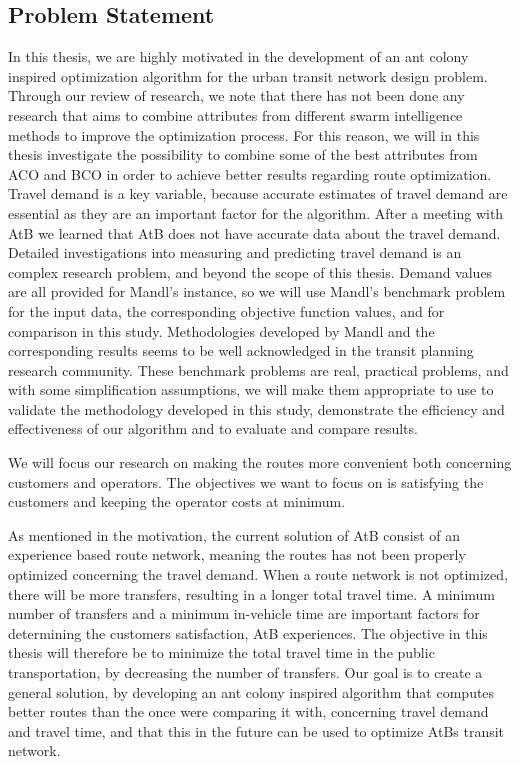 \subsection{Problem Statement}
In this thesis, we are highly motivated in the development of an ant colony inspired optimization algorithm for the urban transit network design problem. Through our review of research, we note that there has not been done any research that aims to combine attributes from different swarm intelligence methods to improve the optimization process. For this reason, we will in this thesis investigate the possibility to combine some of the best attributes from ACO and BCO in order to achieve better results regarding route optimization. Travel demand is a key variable, because accurate estimates of travel demand are essential as they are an important factor for the algorithm. After a meeting with AtB we learned that AtB does not have accurate data about the travel demand. Detailed investigations into measuring and predicting travel demand is an complex research problem, and beyond the scope of this thesis. Demand values are all provided for Mandl's instance, so we will use Mandl's benchmark problem \citep{mandl79} for the input data, the corresponding objective function values, and for comparison in this study. Methodologies developed by Mandl and the corresponding results seems to be well acknowledged in the transit planning research community. These benchmark problems are real, practical problems, and with some simplification assumptions, we will make them appropriate to use to validate the methodology developed in this study, demonstrate the efficiency and effectiveness of our algorithm and to evaluate and compare results. 

We will focus our research on making the routes more convenient both concerning customers and operators. The objectives we want to focus on is satisfying the customers and keeping the operator costs at minimum. 

As mentioned in the motivation, %
the current solution of AtB consist of an experience based route network, meaning the routes has not been properly optimized concerning the travel demand. When a route network is not optimized, there will be more transfers, resulting in a longer total travel time. A minimum number of transfers and a minimum in-vehicle time are important factors for determining the customers satisfaction, AtB experiences. The objective in this thesis will therefore be to minimize the total travel time in the public transportation, by decreasing the number of transfers. %
Our goal is to create a general solution, by developing an ant colony inspired algorithm that computes better routes than the once were comparing it with, concerning travel demand and travel time, and that this in the future can be used to optimize AtBs transit network. 

